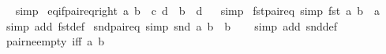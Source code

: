 \begin{isabellebody}
\isadelimproof
\ %
\endisadelimproof
%
\isatagproof
{}\isamarkupfalse%
\ simp%
\endisatagproof
{\isafoldproof}%
%
\isadelimproof
%
\endisadelimproof
\isanewline
\isanewline
{}\isamarkupfalse%
\ eq{\isacharunderscore}{\kern0pt}if{\isacharunderscore}{\kern0pt}pair{\isacharunderscore}{\kern0pt}eq{\isacharunderscore}{\kern0pt}right{\isacharcolon}{\kern0pt}\ {\isachardoublequoteopen}{\isasymlangle}a{\isacharcomma}{\kern0pt}\ b{\isasymrangle}\ {\isacharequal}{\kern0pt}\ {\isasymlangle}c{\isacharcomma}{\kern0pt}\ d{\isasymrangle}\ {\isasymLongrightarrow}\ b\ {\isacharequal}{\kern0pt}\ d{\isachardoublequoteclose}%
\isadelimproof
\ %
\endisadelimproof
%
\isatagproof
{}\isamarkupfalse%
\ simp%
\endisatagproof
{\isafoldproof}%
%
\isadelimproof
%
\endisadelimproof
\isanewline
\isanewline
{}\isamarkupfalse%
\ fst{\isacharunderscore}{\kern0pt}pair{\isacharunderscore}{\kern0pt}eq\ {\isacharbrackleft}{\kern0pt}simp{\isacharbrackright}{\kern0pt}{\isacharcolon}{\kern0pt}\ {\isachardoublequoteopen}fst\ {\isasymlangle}a{\isacharcomma}{\kern0pt}\ b{\isasymrangle}\ {\isacharequal}{\kern0pt}\ a{\isachardoublequoteclose}\isanewline
%
\isadelimproof
\ \ %
\endisadelimproof
%
\isatagproof
{}\isamarkupfalse%
\ {\isacharparenleft}{\kern0pt}simp\ add{\isacharcolon}{\kern0pt}\ fst{\isacharunderscore}{\kern0pt}def{\isacharparenright}{\kern0pt}%
\endisatagproof
{\isafoldproof}%
%
\isadelimproof
\isanewline
%
\endisadelimproof
\isanewline
{}\isamarkupfalse%
\ snd{\isacharunderscore}{\kern0pt}pair{\isacharunderscore}{\kern0pt}eq\ {\isacharbrackleft}{\kern0pt}simp{\isacharbrackright}{\kern0pt}{\isacharcolon}{\kern0pt}\ {\isachardoublequoteopen}snd\ {\isasymlangle}a{\isacharcomma}{\kern0pt}\ b{\isasymrangle}\ {\isacharequal}{\kern0pt}\ b{\isachardoublequoteclose}\isanewline
%
\isadelimproof
\ \ %
\endisadelimproof
%
\isatagproof
{}\isamarkupfalse%
\ {\isacharparenleft}{\kern0pt}simp\ add{\isacharcolon}{\kern0pt}\ snd{\isacharunderscore}{\kern0pt}def{\isacharparenright}{\kern0pt}%
\endisatagproof
{\isafoldproof}%
%
\isadelimproof
\isanewline
%
\endisadelimproof
\isanewline
{}\isamarkupfalse%
\ pair{\isacharunderscore}{\kern0pt}ne{\isacharunderscore}{\kern0pt}empty\ {\isacharbrackleft}{\kern0pt}iff{\isacharbrackright}{\kern0pt}{\isacharcolon}{\kern0pt}\ {\isachardoublequoteopen}{\isasymlangle}a{\isacharcomma}{\kern0pt}\ b{\isasymrangle}\ {\isasymnoteq}\ {\isacharbraceleft}{\kern0pt}{\isacharbraceright}{\kern0pt}{\isachardoublequoteclose}\isanewline
%
\isadelimproof
\ \ %
\endisadelimproof

\end{isabellebody}
